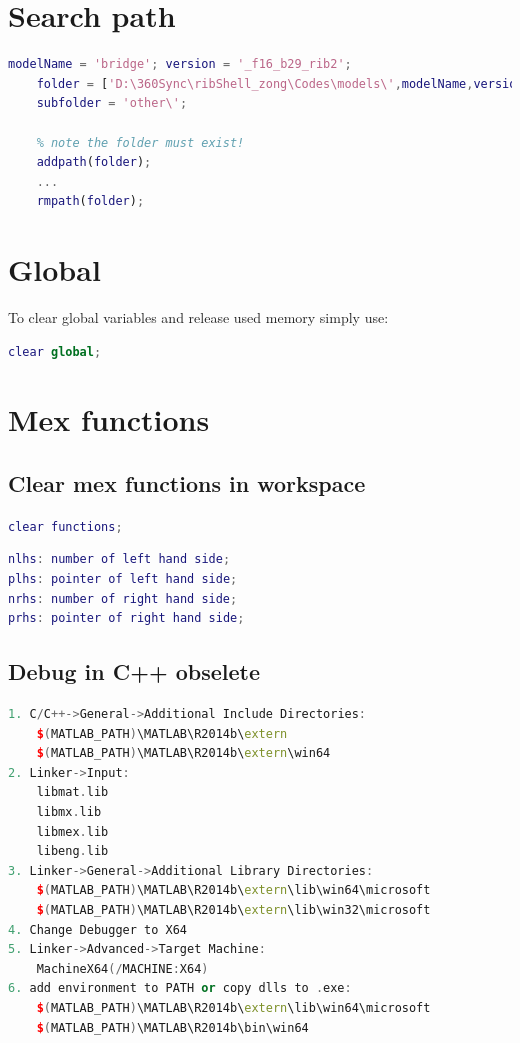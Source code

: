 \documentclass[10pt,a4paper]{article}
\begin{document}
\section{Search path}
\begin{lstlisting}[language=matlab]
	modelName = 'bridge'; version = '_f16_b29_rib2';
	folder = ['D:\360Sync\ribShell_zong\Codes\models\',modelName,version,'\'];
	subfolder = 'other\';
	
	% note the folder must exist!
	addpath(folder);
	...
	rmpath(folder);
\end{lstlisting}

\section{Global}
To clear global variables and release used memory simply use:
\begin{lstlisting}[language=matlab]
clear global;
\end{lstlisting}

\section{Mex functions}
\subsection{Clear mex functions in workspace}
\lstinline[language=matlab]{clear functions;}

\begin{lstlisting}[language=matlab]
nlhs: number of left hand side;
plhs: pointer of left hand side;
nrhs: number of right hand side;
prhs: pointer of right hand side;
\end{lstlisting}

\subsection{Debug in C++ obselete}
\begin{lstlisting}[language=c++]
1. C/C++->General->Additional Include Directories:
	$(MATLAB_PATH)\MATLAB\R2014b\extern
	$(MATLAB_PATH)\MATLAB\R2014b\extern\win64
2. Linker->Input:
	libmat.lib
	libmx.lib
	libmex.lib
	libeng.lib
3. Linker->General->Additional Library Directories:
	$(MATLAB_PATH)\MATLAB\R2014b\extern\lib\win64\microsoft
	$(MATLAB_PATH)\MATLAB\R2014b\extern\lib\win32\microsoft
4. Change Debugger to X64
5. Linker->Advanced->Target Machine:
	MachineX64(/MACHINE:X64)
6. add environment to PATH or copy dlls to .exe:
	$(MATLAB_PATH)\MATLAB\R2014b\extern\lib\win64\microsoft
	$(MATLAB_PATH)\MATLAB\R2014b\bin\win64
\end{lstlisting}
\end{document}
